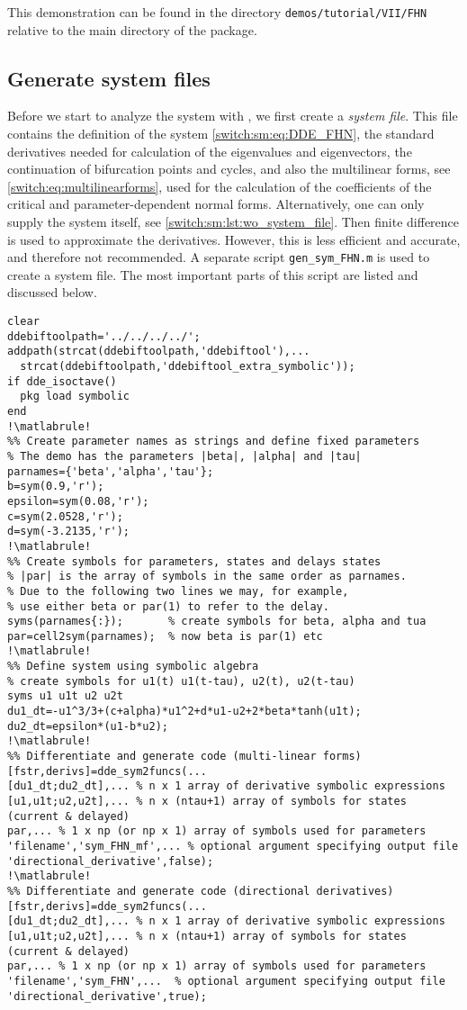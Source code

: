 \begin{remark}
This demonstration can be found in the directory \lstinline|demos/tutorial/VII/FHN| relative to the main directory of the \DDEBIFTOOL package.
\end{remark}

\subsection{Generate system files}
Before we start to analyze the system with \DDEBIFTOOL, we first create a \emph{system file}. This file contains the definition of the system \cref{switch:sm:eq:DDE_FHN}, the standard derivatives needed for calculation of the eigenvalues and eigenvectors, the continuation of bifurcation points and cycles, and also the multilinear forms, see \cref{switch:eq:multilinearforms}, used for the calculation of the coefficients of the critical and parameter-dependent normal forms. Alternatively, one can only supply the system itself, see \cref{switch:sm:lst:wo_system_file}. Then finite difference is used to approximate the derivatives. However, this is less efficient and accurate, and therefore not recommended. A separate script \lstinline|gen_sym_FHN.m| is used to create a system file. The most important parts of this script are listed and discussed below.
\begin{lstlisting}[style=customMatlab,escapechar=!]
%% Add paths and load sym package if GNU Octave is used
clear
ddebiftoolpath='../../../../';
addpath(strcat(ddebiftoolpath,'ddebiftool'),...
  strcat(ddebiftoolpath,'ddebiftool_extra_symbolic'));
if dde_isoctave()
  pkg load symbolic
end
!\matlabrule!
%% Create parameter names as strings and define fixed parameters
% The demo has the parameters |beta|, |alpha| and |tau|
parnames={'beta','alpha','tau'};
b=sym(0.9,'r');
epsilon=sym(0.08,'r');
c=sym(2.0528,'r');
d=sym(-3.2135,'r');
!\matlabrule!
%% Create symbols for parameters, states and delays states
% |par| is the array of symbols in the same order as parnames.
% Due to the following two lines we may, for example,
% use either beta or par(1) to refer to the delay.
syms(parnames{:});       % create symbols for beta, alpha and tua
par=cell2sym(parnames);  % now beta is par(1) etc
!\matlabrule!
%% Define system using symbolic algebra
% create symbols for u1(t) u1(t-tau), u2(t), u2(t-tau)
syms u1 u1t u2 u2t
du1_dt=-u1^3/3+(c+alpha)*u1^2+d*u1-u2+2*beta*tanh(u1t);
du2_dt=epsilon*(u1-b*u2);
!\matlabrule!
%% Differentiate and generate code (multi-linear forms)
[fstr,derivs]=dde_sym2funcs(...
[du1_dt;du2_dt],... % n x 1 array of derivative symbolic expressions
[u1,u1t;u2,u2t],... % n x (ntau+1) array of symbols for states (current & delayed)
par,... % 1 x np (or np x 1) array of symbols used for parameters
'filename','sym_FHN_mf',... % optional argument specifying output file
'directional_derivative',false); 
!\matlabrule!
%% Differentiate and generate code (directional derivatives)
[fstr,derivs]=dde_sym2funcs(...
[du1_dt;du2_dt],... % n x 1 array of derivative symbolic expressions
[u1,u1t;u2,u2t],... % n x (ntau+1) array of symbols for states (current & delayed)
par,... % 1 x np (or np x 1) array of symbols used for parameters
'filename','sym_FHN',...  % optional argument specifying output file
'directional_derivative',true);
\end{lstlisting}
